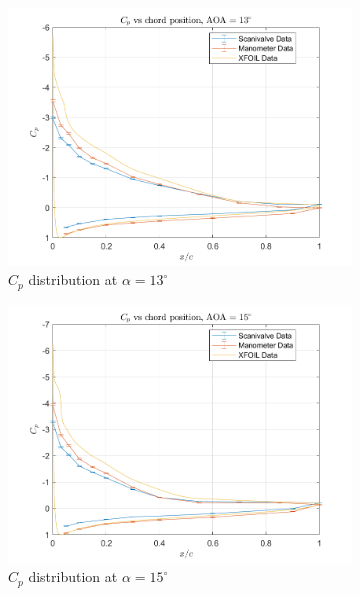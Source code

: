\documentclass[runningheads]{llncs}
\begin{document}
\begin{figure}[h]
\begin{subfigure}[b]{0.3\textwidth}
        \includegraphics[width=\textwidth]{figures/AOA13.png}
        \caption{$C_p$ distribution at $\alpha = 13^\circ$}
        \label{fig:cp_13}
    \end{subfigure}
    \begin{subfigure}[b]{0.3\textwidth}
        \centering
        \includegraphics[width=\textwidth]{figures/AOA15.png}
        \caption{$C_p$ distribution at $\alpha = 15^\circ$}
        \label{fig:cp_15}
    \end{subfigure}
    \begin{subfigure}[b]{0.3\textwidth}
        \centering

\end{subfigure}
\end{figure}
\end{document}
